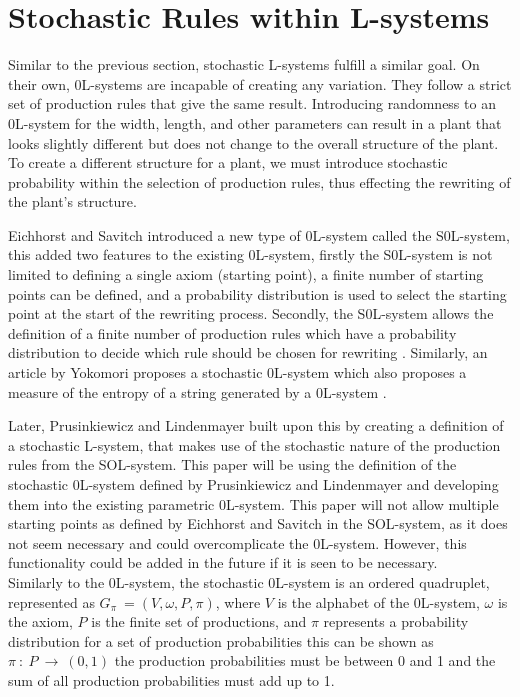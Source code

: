 \section{Stochastic Rules within L-systems} \label{Stochastic L-system Subsection}

Similar to the previous section, stochastic L-systems fulfill a similar goal. On their own, 0L-systems are incapable of creating any variation. They follow a strict set of production rules that give the same result. Introducing randomness to an 0L-system for the width, length, and other parameters can result in a plant that looks slightly different but does not change to the overall structure of the plant. To create a different structure for a plant, we must introduce stochastic probability within the selection of production rules, thus effecting the rewriting of the plant's structure.

Eichhorst and Savitch introduced a new type of 0L-system called the S0L-system, this added two features to the existing 0L-system, firstly the S0L-system is not limited to defining a single axiom (starting point), a finite number of starting points can be defined, and a probability distribution is used to select the starting point at the start of the rewriting process. Secondly, the S0L-system allows the definition of a finite number of production rules which have a probability distribution to decide which rule should be chosen for rewriting \cite{eichhorst1980growth}. Similarly, an article by Yokomori proposes a stochastic 0L-system which also proposes a measure of the entropy of a string generated by a 0L-system \cite{yokomori1980stochastic}.

\newpage
\noindent
Later, Prusinkiewicz and Lindenmayer built upon this by creating a definition of a stochastic L-system, that makes use of the stochastic nature of the production rules from the SOL-system. This paper will be using the definition of the stochastic 0L-system defined by Prusinkiewicz and Lindenmayer and developing them into the existing parametric 0L-system. This paper will not allow multiple starting points as defined by Eichhorst and Savitch in the SOL-system, as it does not seem necessary and could overcomplicate the 0L-system. However, this functionality could be added in the future if it is seen to be necessary. \\
Similarly to the 0L-system, the stochastic 0L-system is an ordered quadruplet, represented as $G_\pi~ = (V, \omega, P, \pi)$, where $V$ is the alphabet of the 0L-system, $\omega$ is the axiom, $P$ is the finite set of productions, and $\pi$ represents a probability distribution for a set of production probabilities this can be shown as $\pi~ :~ P~ \rightarrow~ (0, 1)$ the production probabilities must be between 0 and 1 and the sum of all production probabilities must add up to 1.

